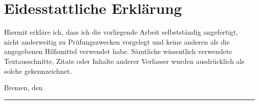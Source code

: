 \chapter*{Eidesstattliche Erkl\"arung}



Hiermit erkl\"are ich, dass ich die vorliegende Arbeit selbstst\"andig angefertigt,
nicht anderweitig zu Pr\"ufungszwecken vorgelegt und keine anderen als die
angegebenen Hilfsmittel verwendet habe. S\"amtliche wissentlich verwendete
Textausschnitte, Zitate oder Inhalte anderer Verfasser wurden ausdr\"ucklich als
solche gekennzeichnet.

Bremen, den \makeatletter\@date\makeatother

\vspace*{1em}
\rule{15em}{0.16667pt}\\
\author{Job Jimmy, Lebelwa Danmou}
\makeatletter\@author\makeatother